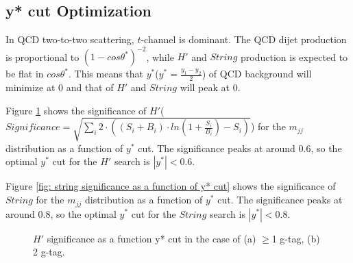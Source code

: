 \subsection{y* cut Optimization}
\label{section: y* cut optimization}


In QCD two-to-two scattering, $t$-channel is dominant. The QCD dijet production is proportional to $(1-cos\theta^{*})^{-2}$, while $H'$ and $String$ production is expected to be flat in $cos\theta^{*}$.
This means that $y^{*}$($y^{*} = \frac{y_{1}-y_{2}}{2}$) of QCD background will minimize at 0 and that of $H'$ and $String$ will peak at 0.

Figure \ref{fig: hprime significance as a function of y* cut} shows the significance of $H'$($Significance = \sqrt{\sum_{i}{2\cdot((S_{i}+B_{i})\cdot ln(1+\frac{S_{i}}{B_{i}})-S_{i})}}$) for the $m_{jj}$ distribution as a function of $y^{*}$ cut. The significance peaks at around 0.6, so the optimal $y^{*}$ cut for the $H'$ search is $|y^{*}| < 0.6$.

Figure \ref{fig: string significance as a function of y* cut} shows the significance of $String$ for the $m_{jj}$ distribution as a function of $y^{*}$ cut. The significance peaks at around 0.8, so the optimal $y^{*}$ cut for the $String$ search is $|y^{*}| < 0.8$.

\begin{figure}[htbp]
        \centering
        \caption{$H'$ significance as a function y* cut in the case of (a) $\geq$1 g-tag, (b) 2 g-tag.}
        \label{fig: hprime significance as a function of y* cut}
\end{figure}


